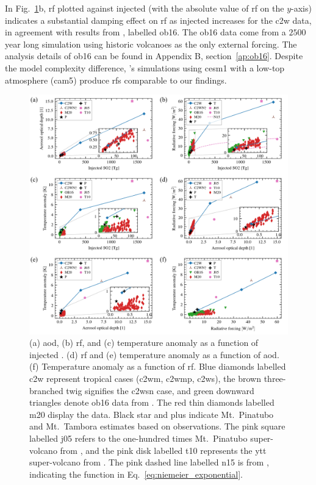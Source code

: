\documentclass{ametsocV6.1}
\newcommand{\iso}[1][i]{{#1}njected \ce{SO2}}
\begin{document}
In Fig.~\ref{fig:4_parameter_scan}b, \gls{rf} plotted against \iso{} (with the absolute
value of \gls{rf} on the \(y\)-axis) indicates a substantial damping effect on \gls{rf}
as \iso{} increases for the \gls{c2w} data, in agreement with results from
\citet{ottobliesner2016}, labelled \gls{ob16}. The \gls{ob16} data come from a \(2500\)
year long simulation using historic volcanoes as the only external forcing. The analysis
details of \gls{ob16} can be found in Appendix B, section~\ref{ap:ob16}. Despite the
model complexity difference, \citet{ottobliesner2016}'s simulations using \gls{cesm1}
with a low-top atmosphere (\gls{cam5}) produce \glspl{rf} comparable to our findings.

\begin{figure}
  \centering
  \includegraphics[width=\linewidth]{figures/figure4.png}

  \caption{(a) \gls{aod}, (b) \gls{rf}, and (c) temperature anomaly as a function of
    \iso{}\@. (d) \gls{rf} and (e) temperature anomaly as a function of \gls{aod}. (f)
    Temperature anomaly as a function of \gls{rf}. Blue diamonds labelled \gls{c2w}
    represent tropical cases (\gls{c2wm}, \gls{c2wmp}, \gls{c2ws}), the brown three-branched
    twig signifies the \gls{c2wsn} case, and green downward triangles denote \gls{ob16} data
    from \citet{ottobliesner2016}. The red thin diamonds labelled \gls{m20} display the
    \citet{marshall2020dataset} data. Black star and plus indicate Mt.\ Pinatubo and Mt.\
    Tambora estimates based on observations. The pink square labelled \gls{j05} refers to
    the one-hundred times Mt.\ Pinatubo super-volcano from \citet{jones2005}, and the pink
    disk labelled \gls{t10} represents the \gls{ytt} super-volcano from
    \citet{timmreck2010}. The pink dashed line labelled \gls{n15} is from
    \citet{niemeier2015}, indicating the function in
    Eq.~\ref{eq:niemeier_exponential}.}\label{fig:4_parameter_scan}%
\end{figure}
\end{document}
